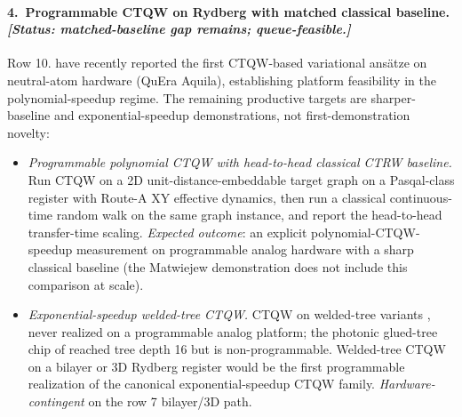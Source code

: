 \documentclass[10pt]{article}
\begin{document}
\paragraph{4.\ Programmable CTQW on Rydberg with matched classical baseline. \emph{[Status: matched-baseline gap remains; queue-feasible.]}}
Row 10. \citet{matwiejew2025ctqw} have recently reported the first CTQW-based variational ansätze on neutral-atom hardware (QuEra Aquila), establishing platform feasibility in the polynomial-speedup regime. The remaining productive targets are sharper-baseline and exponential-speedup demonstrations, not first-demonstration novelty:
\begin{itemize}[leftmargin=2em, itemsep=0.2em, topsep=0.3em]
\item[\textit{4a.}] \emph{Programmable polynomial CTQW with head-to-head classical CTRW baseline.} Run CTQW on a 2D unit-distance-embeddable target graph on a Pasqal-class register with Route-A XY effective dynamics, then run a classical continuous-time random walk on the same graph instance, and report the head-to-head transfer-time scaling. \emph{Expected outcome}: an explicit polynomial-CTQW-speedup measurement on programmable analog hardware with a sharp classical baseline (the Matwiejew demonstration does not include this comparison at scale).
\item[\textit{4b.}] \emph{Exponential-speedup welded-tree CTQW.} CTQW on welded-tree variants \cite{childs2003exponential}, never realized on a programmable analog platform; the photonic glued-tree chip of \citet{tang2018photonic_welded} reached tree depth 16 but is non-programmable. Welded-tree CTQW on a bilayer or 3D Rydberg register would be the first programmable realization of the canonical exponential-speedup CTQW family. \emph{Hardware-contingent} on the row 7 bilayer/3D path.
\end{itemize}
\end{document}
